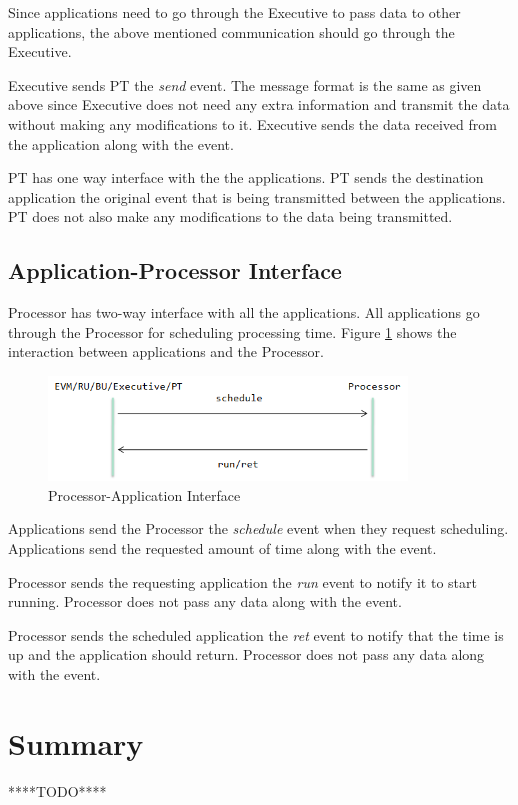 Since applications need to go through the Executive to pass data to other applications, the above mentioned communication should go through the Executive. 

Executive sends PT the \textit{send} event. The message format is the same as given above since Executive does not need any extra information and transmit the data without making any modifications to it. Executive sends the data received from the application along with the event. 

PT has one way interface with the the applications. PT sends the destination application the original event that is being transmitted between the applications. PT does not also make any modifications to the data being transmitted.



\subsection{Application-Processor Interface}

Processor has two-way interface with all the applications. All applications go through the Processor for scheduling processing time. Figure \ref{fig:processor-app} shows the interaction between applications and the Processor.

\begin{figure}
	\centering
		\includegraphics[width=0.85\textwidth]{figures/processor-app.png}
	\caption{Processor-Application Interface}
	\label{fig:processor-app}
\end{figure}

Applications send the Processor the \textit{schedule} event when they request scheduling. Applications send the requested amount of time along with the event.

Processor sends the requesting application the \textit{run} event to notify it to start running. Processor does not pass any data along with the event.

Processor sends the scheduled application the \textit{ret} event to notify that the time is up and the application should return. Processor does not pass any data along with the event. 


\section{Summary}
****TODO****


